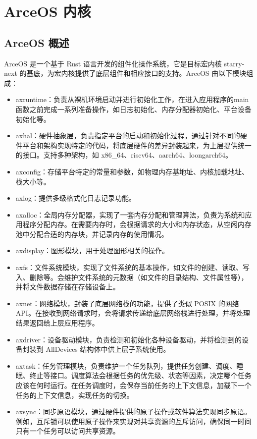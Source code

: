 
\chapter{ArceOS 内核}

\section{ArceOS 概述}

ArceOS 是一个基于 Rust 语言开发的组件化操作系统，它是目标宏内核 starry-next 的基底，为宏内核提供了底层组件和相应接口的支持。ArceOS 由以下模块组成：

\begin{itemize}
\item axruntime：负责从裸机环境启动并进行初始化工作，在进入应用程序的main函数之前完成一系列准备操作，如日志初始化、内存分配器初始化、平台设备初始化等。
\item axhal：硬件抽象层，负责指定平台的启动和初始化过程，通过针对不同的硬件平台和架构实现特定的代码，将底层硬件的差异封装起来，为上层提供统一的接口。支持多种架构，如 x86\_64、riscv64、aarch64、loongarch64。
\item axconfig：存储平台特定的常量和参数，如物理内存基地址、内核加载地址、栈大小等。
\item axlog：提供多级格式化日志记录功能。
\item axalloc：全局内存分配器，实现了一套内存分配和管理算法，负责为系统和应用程序分配内存。在需要内存时，会根据请求的大小和内存状态，从空闲内存池中分配合适的内存块，并记录内存的使用情况。
\item axdisplay：图形模块，用于处理图形相关的操作。
\item axfs：文件系统模块，实现了文件系统的基本操作，如文件的创建、读取、写入、删除等。会维护文件系统的元数据（如文件的目录结构、文件属性等），并将文件数据存储在存储设备上。
\item axnet：网络模块，封装了底层网络栈的功能，提供了类似 POSIX 的网络 API。在接收到网络请求时，会将请求传递给底层网络栈进行处理，并将处理结果返回给上层应用程序。
\item axdriver：设备驱动模块，负责检测和初始化各种设备驱动，并将检测到的设备封装到 AllDevices 结构体中供上层子系统使用。
\item axtask：任务管理模块，负责维护一个任务队列，提供任务创建、调度、睡眠、终止等接口。调度算法会根据任务的优先级、状态等因素，决定哪个任务应该在何时运行。在任务调度时，会保存当前任务的上下文信息，加载下一个任务的上下文信息，实现任务的切换。
\item axsync：同步原语模块，通过硬件提供的原子操作或软件算法实现同步原语。例如，互斥锁可以使用原子操作来实现对共享资源的互斥访问，确保同一时间只有一个任务可以访问共享资源。

\end{itemize}
